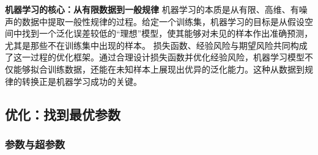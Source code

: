 {\bf 机器学习的核心：从有限数据到一般规律}
机器学习的本质是从有限、高维、有噪声的数据中提取一般性规律的过程。给定一个训练集，机器学习的目标是从假设空间中找到一个泛化误差较低的“理想”模型，使其能够对未见的样本作出准确预测，尤其是那些不在训练集中出现的样本。
损失函数、经验风险与期望风险共同构成了这一过程的优化框架。通过合理设计损失函数并优化经验风险，机器学习模型不仅能够拟合训练数据，还能在未知样本上展现出优异的泛化能力。这种从数据到规律的转换正是机器学习成功的关键。


\subsection{优化：找到最优参数}



\subsubsection{参数与超参数}


